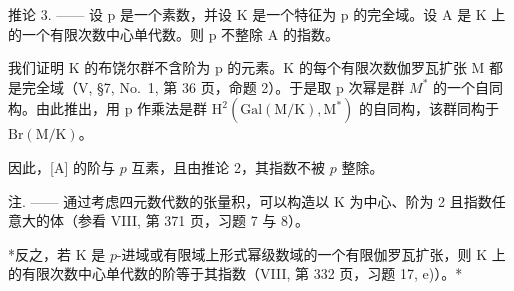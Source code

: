 推论 3. —— 设 p 是一个素数，并设 K 是一个特征为 p 的完全域。设 A 是 K 上的一个有限次数中心单代数。则 p 不整除 A 的指数。

我们证明 K 的布饶尔群不含阶为 p 的元素。K 的每个有限次数伽罗瓦扩张 M 都是完全域（V, §7, No.~1, 第 36 页，命题 2）。于是取 p 次幂是群 \(M^{*}\) 的一个自同构。由此推出，用 p 作乘法是群 \(\mathrm{H}^{2}(\mathrm{Gal}(\mathrm{M}/\mathrm{K}),\mathrm{M}^{*})\) 的自同构，该群同构于 \(\mathrm{Br}(\mathrm{M}/\mathrm{K})\)。

因此，{[}A{]} 的阶与 \(p\) 互素，且由推论 2，其指数不被 \(p\) 整除。

注. —— 通过考虑四元数代数的张量积，可以构造以 K 为中心、阶为 2 且指数任意大的体（参看 VIII, 第 371 页，习题 7 与 8）。

*反之，若 K 是 \(p\)-进域或有限域上形式幂级数域的一个有限伽罗瓦扩张，则 K 上的有限次数中心单代数的阶等于其指数（VIII, 第 332 页，习题 17, e)）。*

